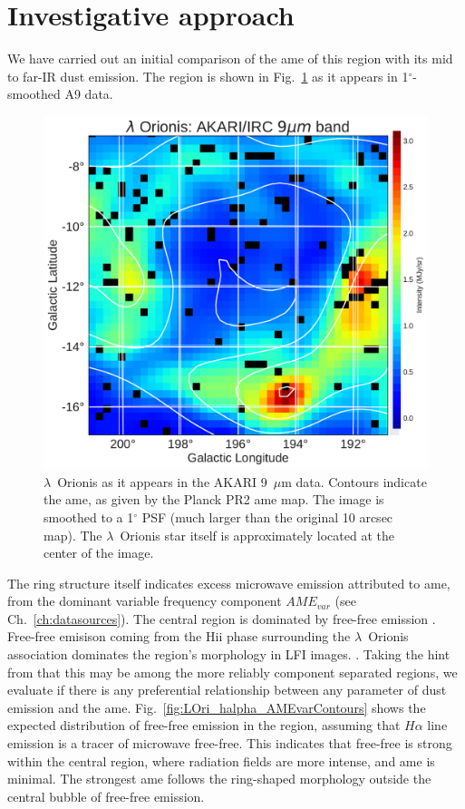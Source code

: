\section{Investigative approach}
  We have carried out an initial comparison of the \acrshort{ame} of this region with its mid to far-IR dust emission. The region is shown in Fig.~\ref{fig:orionis-akari9} as it appears in 1$^{\circ}$-smoothed A9 data.
      \begin{figure}
        \includegraphics[width=\textwidth]{../Plots/LOri_akari9_AMEcont_1dres.pdf}
        \centering
        \caption{$\lambda$~Orionis as it appears in the AKARI 9~$\mu$m data. Contours indicate the \acrshort{ame}, as given by the Planck PR2 \acrshort{ame} map. The image is smoothed to a 1$^{\circ}$ PSF (much larger than the original 10 arcsec map). The $\lambda$~Orionis star itself is approximately located at the center of the image.}
        \label{fig:orionis-akari9}
      \end{figure}
   The ring structure itself indicates excess microwave emission attributed to \acrshort{ame}, from the dominant variable frequency component $AME_{var}$ (see Ch.~\ref{ch:datasources}). The central region is dominated by free-free emission \citep{aran09, koenig15}. Free-free emisison coming from the Hii phase surrounding the $\lambda$~Orionis association dominates the region's morphology in LFI images. \citep{planck15XXV}. Taking the hint from \cite{planck15XXV} that this may be among the more reliably component separated regions, we evaluate if there is any preferential relationship between any parameter of dust emission and the \acrshort{ame}. Fig.~\ref{fig:LOri_halpha_AMEvarContours} shows the expected distribution of free-free emission in the region, assuming that $H\alpha$ line emission is a tracer of microwave free-free. This indicates that free-free is strong within the central region, where radiation fields are more intense, and \acrshort{ame} is minimal. The strongest \acrshort{ame} follows the ring-shaped morphology outside the central bubble of free-free emission.
